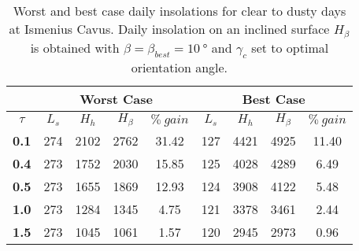 \begin{table}[h]
\footnotesize
\centering
\caption[Worst and best case daily insolations for clear to dusty days at Ismenius Cavus]
{Worst and best case daily insolations for clear to dusty days at Ismenius Cavus. Daily insolation on an inclined surface $H_{\beta}$ is obtained with $\beta = \beta_{best} = \SI{10}{\degree}$ and $\gamma_{c}$ set to optimal orientation angle.}
\label{tab:insolation-ismenius-cavus-clear-and-dusty-days}
\begin{tabular}{c|c|c|c|c|c|c|c|c|}
\cline{2-9}
\multicolumn{1}{l|}{} & \multicolumn{4}{c|}{\textbf{Worst Case}} & \multicolumn{4}{c|}{\textbf{Best Case}} \\ \hline
\multicolumn{1}{|c|}{$\tau$} & $L_{s}$ & $H_{h}$ & $H_{\beta}$ & $\%\:gain$ & $L_{s}$ & $H_{h}$ & $H_{\beta}$ & $\%\:gain$ \\ \hline
\multicolumn{1}{|c|}{\textbf{0.1}} & 274 & 2102 & 2762 & 31.42 & 127 & 4421 & 4925 & 11.40 \\ \hline
\multicolumn{1}{|c|}{\textbf{0.4}} & 273 & 1752 & 2030 & 15.85 & 125 & 4028 & 4289 & 6.49 \\ \hline
\multicolumn{1}{|c|}{\textbf{0.5}} & 273 & 1655 & 1869 & 12.93 & 124 & 3908 & 4122 & 5.48 \\ \hline
\multicolumn{1}{|c|}{\textbf{1.0}} & 273 & 1284 & 1345 & 4.75 & 121 & 3378 & 3461 & 2.44 \\ \hline
\multicolumn{1}{|c|}{\textbf{1.5}} & 273 & 1045 & 1061 & 1.57 & 120 & 2945 & 2973 & 0.96 \\ \hline
\end{tabular}
\end{table}
